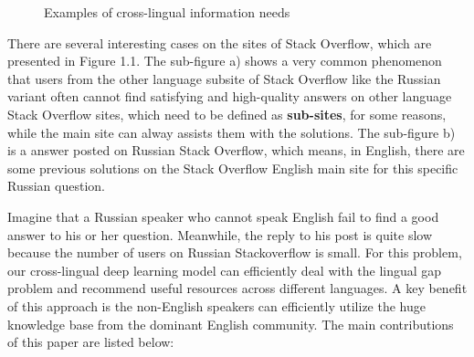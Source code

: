 	\begin{figure}[!h]
	\centering
	\caption{Examples of cross-lingual information needs}
	\label{fig}
\end{figure}
	There are several interesting cases on the sites of Stack Overflow, which are presented in Figure 1.1. The sub-figure a) shows a very common phenomenon that users from the other language subsite of Stack Overflow like the Russian variant often cannot find satisfying and high-quality answers on other language Stack Overflow sites, which need to be defined as {\bf sub-sites}, for some reasons, while the main site can alway assists them with the solutions. The sub-figure b) is a answer posted on Russian Stack Overflow, which means, in English, there are some previous solutions on the Stack Overflow English main site for this specific Russian question.  
\par
	Imagine that a Russian speaker who cannot speak English fail to find a good answer to his or her question. Meanwhile, the reply to his post is quite slow because the number of users on Russian Stackoverflow is small. For this problem, our cross-lingual deep learning model can efficiently deal with the lingual gap problem and recommend useful resources across different languages. A key benefit of this approach is the non-English speakers can efficiently utilize the huge knowledge base from the dominant English community.
	The main contributions of this paper are listed below:
	

